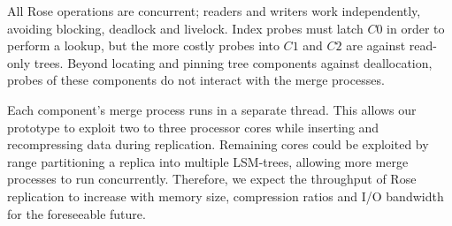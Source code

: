 \documentclass{vldb}
\newcommand{\rows}{Rose\xspace}
\newcommand{\rowss}{Rose's\xspace}
\begin{document}
All \rows operations are concurrent; readers and writers work
independently, avoiding blocking, deadlock and livelock.  Index probes
must latch $C0$ in order to perform a lookup, but the more costly
probes into $C1$ and $C2$ are against read-only trees.  Beyond locating
and pinning tree components against deallocation, probes of these
components do not interact with the merge processes.

Each component's merge process runs in a separate thread.  This
allows our prototype to exploit two to three processor cores while
inserting and recompressing data during replication.  Remaining cores
could be exploited by range partitioning a replica into multiple
LSM-trees, allowing more merge processes to run concurrently.
Therefore, we expect the throughput of \rows replication to increase
with memory size, compression ratios and I/O bandwidth for the foreseeable future.




\end{document}
